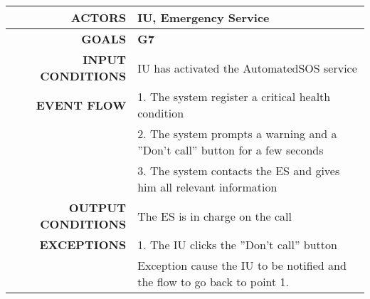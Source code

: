 \begin{table}[h!]
\begin{tabular}{|r|p{3in}|}
\hline
\textbf{ACTORS} & IU, Emergency Service\\
\hline
\textbf{GOALS} & \textbf{G7} \\
\hline
\textbf{INPUT CONDITIONS} & IU has activated the AutomatedSOS service \\
\hline
\textbf{EVENT FLOW} 
&1. The system register a critical health condition \\
&2. The system prompts a warning and a ''Don't call'' button for a few seconds \\
&3. The system contacts the ES and gives him all relevant information \\
\hline
\textbf{OUTPUT CONDITIONS} & The ES is in charge on the call\\
\hline
\textbf{EXCEPTIONS} 
&1. The IU clicks the ''Don't call'' button \\
&Exception cause the IU to be notified and the flow to go back to point 1.\\
\hline
\end{tabular}
\end{table}